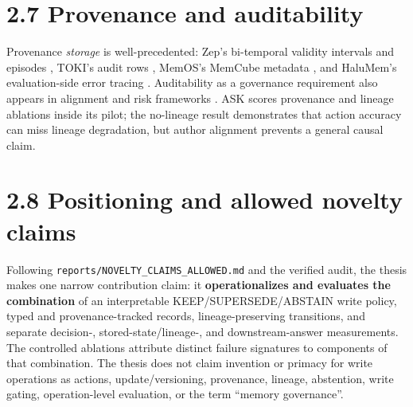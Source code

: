 \section{2.7 Provenance and
auditability}\label{provenance-and-auditability}

Provenance \emph{storage} is well-precedented: Zep's bi-temporal
validity intervals and episodes \citep{rasmussen2025zep}, TOKI's audit
rows \citep{wang2026toki}, MemOS's MemCube metadata \citep{li2025memos},
and HaluMem's evaluation-side error tracing \citep{halumem2025}.
Auditability as a governance requirement also appears in alignment and
risk frameworks
\citep{ouyang2022training, bai2022constitutional, nist2023airmf}. ASK
scores provenance and lineage ablations inside its pilot; the no-lineage
result demonstrates that action accuracy can miss lineage degradation,
but author alignment prevents a general causal claim.

\section{2.8 Positioning and allowed novelty
claims}\label{positioning-and-allowed-novelty-claims}

Following \texttt{reports/NOVELTY\_CLAIMS\_ALLOWED.md} and the verified
audit, the thesis makes one narrow contribution claim: it
\textbf{operationalizes and evaluates the combination} of an
interpretable KEEP/SUPERSEDE/ABSTAIN write policy, typed and
provenance-tracked records, lineage-preserving transitions, and separate
decision-, stored-state/lineage-, and downstream-answer measurements.
The controlled ablations attribute distinct failure signatures to
components of that combination. The thesis does not claim invention or
primacy for write operations as actions, update/versioning, provenance,
lineage, abstention, write gating, operation-level evaluation, or the
term ``memory governance''.
